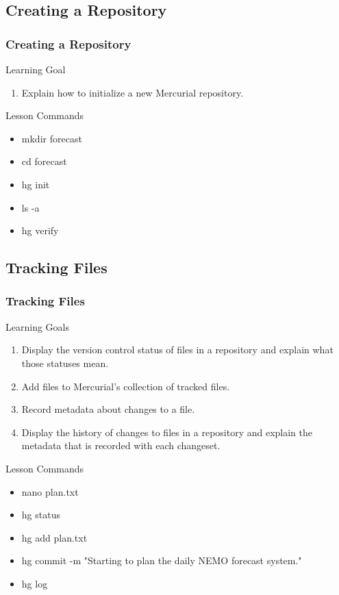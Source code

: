 \documentclass{beamer}
\begin{document}
\subsection*{Creating a Repository}
\begin{frame}
\frametitle{Creating a Repository}
\begin{block}{Learning Goal}
\begin{enumerate}
\item Explain how to initialize a new Mercurial repository.
\end{enumerate}
\end{block}

\begin{block}{Lesson Commands}
\begin{multicols}{2}
\begin{itemize}
\item mkdir forecast
\item cd forecast
\item hg init
\item ls -a
\item hg verify
\end{itemize}
\end{multicols}
\end{block}
\end{frame}

\subsection*{Tracking Files}
\begin{frame}
\frametitle{Tracking Files}
\begin{block}{Learning Goals}
\begin{enumerate}
\item Display the version control status of files in a repository and explain what those statuses mean.
\item Add files to Mercurial's collection of tracked files.
\item Record metadata about changes to a file.
\item Display the history of changes to files in a repository and explain the metadata that is recorded with each changeset.
\end{enumerate}
\end{block}
\begin{block}{Lesson Commands}
\begin{multicols}{2}
\begin{itemize}
\item nano plan.txt
\item hg status
\item hg add plan.txt
\item hg commit -m "Starting to plan the daily NEMO forecast system."
\item hg log
\end{itemize}
\end{multicols}
\end{block}
\end{frame}
\end{document}
